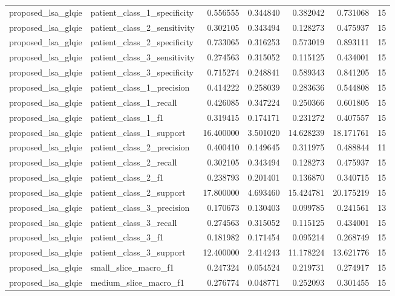 \begin{tabular}{llrrrrr}
proposed_lsa_glqie & patient_class_1_specificity & 0.556555 & 0.344840 & 0.382042 & 0.731068 & 15 \\
proposed_lsa_glqie & patient_class_2_sensitivity & 0.302105 & 0.343494 & 0.128273 & 0.475937 & 15 \\
proposed_lsa_glqie & patient_class_2_specificity & 0.733065 & 0.316253 & 0.573019 & 0.893111 & 15 \\
proposed_lsa_glqie & patient_class_3_sensitivity & 0.274563 & 0.315052 & 0.115125 & 0.434001 & 15 \\
proposed_lsa_glqie & patient_class_3_specificity & 0.715274 & 0.248841 & 0.589343 & 0.841205 & 15 \\
proposed_lsa_glqie & patient_class_1_precision & 0.414222 & 0.258039 & 0.283636 & 0.544808 & 15 \\
proposed_lsa_glqie & patient_class_1_recall & 0.426085 & 0.347224 & 0.250366 & 0.601805 & 15 \\
proposed_lsa_glqie & patient_class_1_f1 & 0.319415 & 0.174171 & 0.231272 & 0.407557 & 15 \\
proposed_lsa_glqie & patient_class_1_support & 16.400000 & 3.501020 & 14.628239 & 18.171761 & 15 \\
proposed_lsa_glqie & patient_class_2_precision & 0.400410 & 0.149645 & 0.311975 & 0.488844 & 11 \\
proposed_lsa_glqie & patient_class_2_recall & 0.302105 & 0.343494 & 0.128273 & 0.475937 & 15 \\
proposed_lsa_glqie & patient_class_2_f1 & 0.238793 & 0.201401 & 0.136870 & 0.340715 & 15 \\
proposed_lsa_glqie & patient_class_2_support & 17.800000 & 4.693460 & 15.424781 & 20.175219 & 15 \\
proposed_lsa_glqie & patient_class_3_precision & 0.170673 & 0.130403 & 0.099785 & 0.241561 & 13 \\
proposed_lsa_glqie & patient_class_3_recall & 0.274563 & 0.315052 & 0.115125 & 0.434001 & 15 \\
proposed_lsa_glqie & patient_class_3_f1 & 0.181982 & 0.171454 & 0.095214 & 0.268749 & 15 \\
proposed_lsa_glqie & patient_class_3_support & 12.400000 & 2.414243 & 11.178224 & 13.621776 & 15 \\
proposed_lsa_glqie & small_slice_macro_f1 & 0.247324 & 0.054524 & 0.219731 & 0.274917 & 15 \\
proposed_lsa_glqie & medium_slice_macro_f1 & 0.276774 & 0.048771 & 0.252093 & 0.301455 & 15 \\

\end{tabular}
